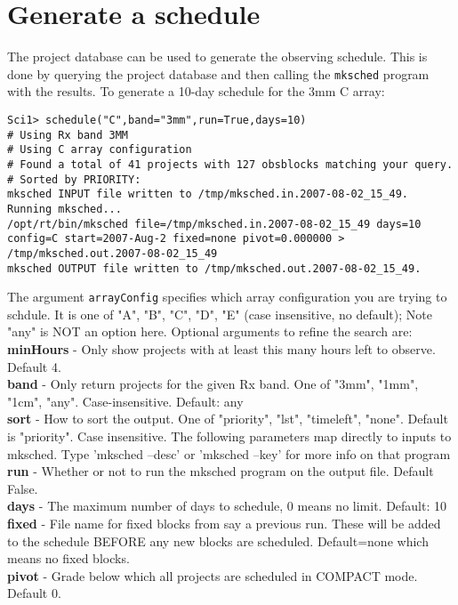 \documentclass[preprint]{aastex} %
\begin{document}
\section{Generate a schedule}
The project database can be used to generate the observing schedule.
This is done by querying the project database and then calling
the {\tt mksched} program with the results.
To generate a 10-day schedule for the 3mm C array:
\begin{verbatim}
Sci1> schedule("C",band="3mm",run=True,days=10)
# Using Rx band 3MM
# Using C array configuration
# Found a total of 41 projects with 127 obsblocks matching your query.
# Sorted by PRIORITY:
mksched INPUT file written to /tmp/mksched.in.2007-08-02_15_49.
Running mksched...
/opt/rt/bin/mksched file=/tmp/mksched.in.2007-08-02_15_49 days=10 config=C start=2007-Aug-2 fixed=none pivot=0.000000 > /tmp/mksched.out.2007-08-02_15_49
mksched OUTPUT file written to /tmp/mksched.out.2007-08-02_15_49.

\end{verbatim}
\noindent The argument {\tt arrayConfig} specifies which array
configuration you are trying to schdule. It is one of "A", "B", "C", "D", "E"
(case insensitive, no default); Note "any" is NOT an option here. 
\noindent Optional arguments to refine the search are:\\
{\bf minHours} - Only show projects with at least this many hours left to observe. Default 4.\\
{\bf band} - Only return projects for the given Rx band. One of "3mm", "1mm", "1cm", "any". Case-insensitive. Default: any\\
{\bf sort} - How to sort the output. One of "priority", "lst", "timeleft", "none".  Default is "priority".  Case insensitive.
The following parameters map directly to inputs to mksched. Type
'mksched --desc' or 'mksched --key' for more info on that program
{\bf run} - Whether or not to run the mksched program on the output file. Default False. \\
{\bf days} -  The maximum number of days to schedule, 0 means no limit. Default: 10 \\
{\bf fixed} -  File name for fixed blocks from say a previous run.  These will be added to the schedule BEFORE any new blocks are scheduled.  Default=none which means no fixed blocks. \\
{\bf pivot} -  Grade below which all projects are scheduled in COMPACT mode. Default 0.
\end{document}
